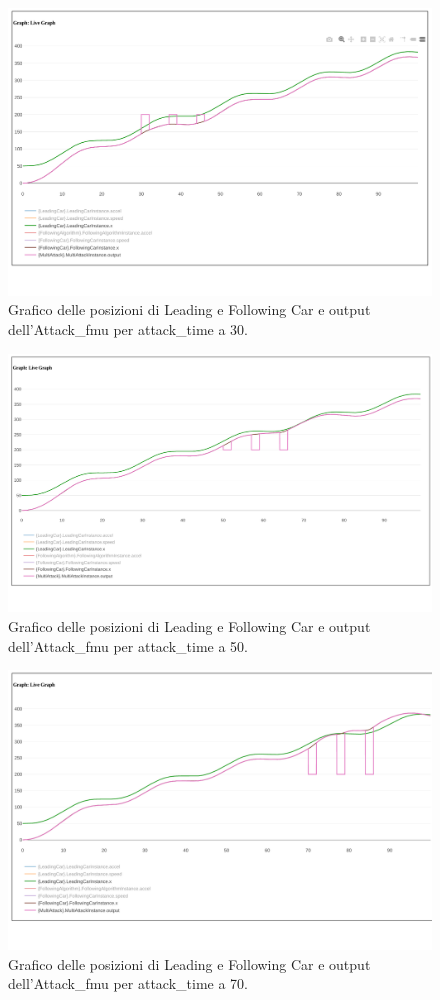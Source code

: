 \begin{figure}[H]
	\centering
	\includegraphics[width=\textwidth]{img/MultiAttackXT30.png}
	\caption{Grafico delle posizioni di Leading e Following Car e output dell'Attack\_fmu per attack\_time a 30.}
\end{figure}\begin{figure}[H]
\centering
\includegraphics[width=\textwidth]{img/MultiAttackXT50.png}
\caption{Grafico delle posizioni di Leading e Following Car e output dell'Attack\_fmu per attack\_time a 50.}
\end{figure}\begin{figure}[H]
\centering
\includegraphics[width=\textwidth]{img/MultiAttackXT70.png}
\caption{Grafico delle posizioni di Leading e Following Car e output dell'Attack\_fmu per attack\_time a 70.}
\end{figure}


